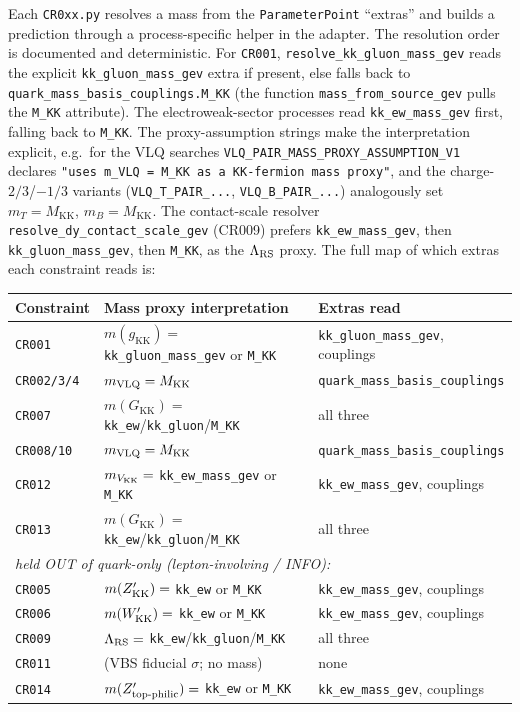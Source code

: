 \documentclass[11pt]{article}
\newcommand{\MKK}{M_{\mathrm{KK}}}
\newcommand{\gKK}{g_{\mathrm{KK}}}
\newcommand{\GKK}{G_{\mathrm{KK}}}
\newcommand{\code}[1]{\texttt{#1}}
\theoremstyle{definition}
\begin{document}
Each \code{CR0xx.py} resolves a mass from the \code{ParameterPoint} ``extras''
and builds a prediction through a process-specific helper in the adapter. The
resolution order is documented and deterministic. For \code{CR001},
\code{resolve\_kk\_gluon\_mass\_gev} reads the explicit \code{kk\_gluon\_mass\_gev}
extra if present, else falls back to \code{quark\_mass\_basis\_couplings.M\_KK}
(the function \code{mass\_from\_source\_gev} pulls the \code{M\_KK} attribute).
The electroweak-sector processes read \code{kk\_ew\_mass\_gev} first, falling
back to \code{M\_KK}. The proxy-assumption strings make the interpretation
explicit, e.g.\ for the VLQ searches \code{VLQ\_PAIR\_MASS\_PROXY\_ASSUMPTION\_V1}
declares \code{"uses m\_VLQ = M\_KK as a KK-fermion mass proxy"}, and the
charge-$2/3$/$-1/3$ variants (\code{VLQ\_T\_PAIR\_...}, \code{VLQ\_B\_PAIR\_...})
analogously set $m_T = \MKK$, $m_B = \MKK$. The contact-scale resolver
\code{resolve\_dy\_contact\_scale\_gev} (CR009) prefers \code{kk\_ew\_mass\_gev},
then \code{kk\_gluon\_mass\_gev}, then \code{M\_KK}, as the
$\Lambda_{\rm RS}$ proxy. The full map of which extras each constraint reads is:
\begin{center}\small
\begin{tabular}{lll}
\toprule
Constraint & Mass proxy interpretation & Extras read \\
\midrule
\code{CR001} & $m(\gKK) = $ \code{kk\_gluon\_mass\_gev} or \code{M\_KK} & \code{kk\_gluon\_mass\_gev}, couplings \\
\code{CR002/3/4} & $m_{\rm VLQ} = \MKK$ & \code{quark\_mass\_basis\_couplings} \\
\code{CR007} & $m(\GKK) = $ \code{kk\_ew}/\code{kk\_gluon}/\code{M\_KK} & all three \\
\code{CR008/10} & $m_{\rm VLQ} = \MKK$ & \code{quark\_mass\_basis\_couplings} \\
\code{CR012} & $m_{V_{\rm KK}} = $ \code{kk\_ew\_mass\_gev} or \code{M\_KK} & \code{kk\_ew\_mass\_gev}, couplings \\
\code{CR013} & $m(\GKK) = $ \code{kk\_ew}/\code{kk\_gluon}/\code{M\_KK} & all three \\
\midrule
\multicolumn{3}{l}{\emph{held OUT of quark-only (lepton-involving / INFO):}} \\
\code{CR005} & $m(Z'_{\rm KK}) = $ \code{kk\_ew} or \code{M\_KK} & \code{kk\_ew\_mass\_gev}, couplings \\
\code{CR006} & $m(W'_{\rm KK}) = $ \code{kk\_ew} or \code{M\_KK} & \code{kk\_ew\_mass\_gev}, couplings \\
\code{CR009} & $\Lambda_{\rm RS} = $ \code{kk\_ew}/\code{kk\_gluon}/\code{M\_KK} & all three \\
\code{CR011} & (VBS fiducial $\sigma$; no mass) & none \\
\code{CR014} & $m(Z'_{\rm top\text{-}philic}) = $ \code{kk\_ew} or \code{M\_KK} & \code{kk\_ew\_mass\_gev}, couplings \\
\bottomrule
\end{tabular}
\end{center}
\end{document}
